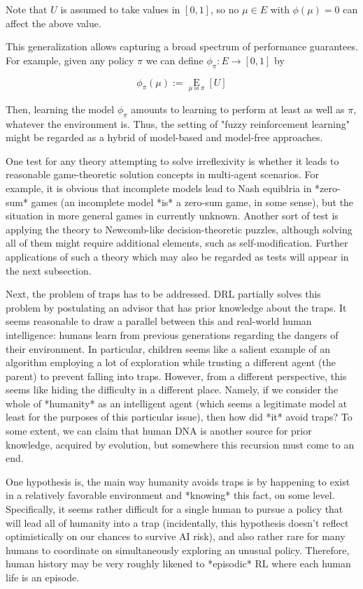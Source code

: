 \documentclass[a4paper]{article}
\newcommand{\AB}[1]{\left[#1\right]}
\newcommand{\Ea}[2]{\underset{#1}{\operatorname{E}}\AB{#2}}
\begin{document}
Note that $U$ is assumed to take values in $[0,1]$, so no $\mu \in E$ with $\phi(\mu) = 0$ can affect the above value.

This generalization allows capturing a broad spectrum of performance guarantees. For example, given any policy $\pi$ we can define $\phi_\pi: E \rightarrow [0,1]$ by

$$\phi_\pi(\mu):=\Ea{\mu\bowtie\pi}{U}$$

Then, learning the model $\phi_\pi$ amounts to learning to perform at least as well as $\pi$, whatever the environment is. Thus, the setting of "fuzzy reinforcement learning" might be regarded as a hybrid of model-based and model-free approaches.

One test for any theory attempting to solve irreflexivity is whether it leads to reasonable game-theoretic solution concepts in multi-agent scenarios. For example, it is obvious that incomplete models lead to Nash equiblria in *zero-sum* games (an incomplete model *is* a zero-sum game, in some sense), but the situation in more general games in currently unknown. Another sort of test is applying the theory to Newcomb-like decision-theoretic puzzles, although solving all of them might require additional elements, such as self-modification. Further applications of such a theory which may also be regarded as tests will appear in the next subsection.

Next, the problem of traps has to be addressed. DRL partially solves this problem by postulating an advisor that has prior knowledge about the traps. It seems reasonable to draw a parallel between this and real-world human intelligence: humans learn from previous generations regarding the dangers of their environment. In particular, children seems like a salient example of an algorithm employing a lot of exploration while trusting a different agent (the parent) to prevent falling into traps. However, from a different perspective, this seems like hiding the difficulty in a different place. Namely, if we consider the whole of *humanity* as an intelligent agent (which seems a legitimate model at least for the purposes of this particular issue), then how did *it* avoid traps? To some extent, we can claim that human DNA is another source for prior knowledge, acquired by evolution, but somewhere this recursion must come to an end.

One hypothesis is, the main way humanity avoids traps is by happening to exist in a relatively favorable environment and *knowing* this fact, on some level. Specifically, it seems rather difficult for a single human to pursue a policy that will lead all of humanity into a trap (incidentally, this hypothesis doesn't reflect optimistically on our chances to survive AI risk), and also rather rare for many humans to coordinate on simultaneously exploring an unusual policy. Therefore, human history may be very roughly likened to *episodic* RL where each human life is an episode.
\end{document}
